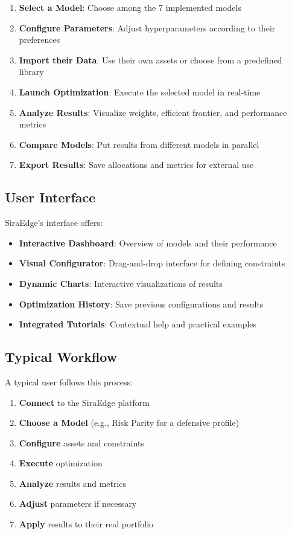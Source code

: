 \documentclass[11pt,a4paper]{article}
\begin{document}
\begin{enumerate}
\item \textbf{Select a Model}: Choose among the 7 implemented models
\item \textbf{Configure Parameters}: Adjust hyperparameters according to their preferences
\item \textbf{Import their Data}: Use their own assets or choose from a predefined library
\item \textbf{Launch Optimization}: Execute the selected model in real-time
\item \textbf{Analyze Results}: Visualize weights, efficient frontier, and performance metrics
\item \textbf{Compare Models}: Put results from different models in parallel
\item \textbf{Export Results}: Save allocations and metrics for external use
\end{enumerate}

\subsection{User Interface}
SiraEdge's interface offers:

\begin{itemize}
\item \textbf{Interactive Dashboard}: Overview of models and their performance
\item \textbf{Visual Configurator}: Drag-and-drop interface for defining constraints
\item \textbf{Dynamic Charts}: Interactive visualizations of results
\item \textbf{Optimization History}: Save previous configurations and results
\item \textbf{Integrated Tutorials}: Contextual help and practical examples
\end{itemize}

\subsection{Typical Workflow}
A typical user follows this process:

\begin{enumerate}
\item \textbf{Connect} to the SiraEdge platform
\item \textbf{Choose a Model} (e.g., Risk Parity for a defensive profile)
\item \textbf{Configure} assets and constraints
\item \textbf{Execute} optimization
\item \textbf{Analyze} results and metrics
\item \textbf{Adjust} parameters if necessary
\item \textbf{Apply} results to their real portfolio
\end{enumerate}
\end{document}

